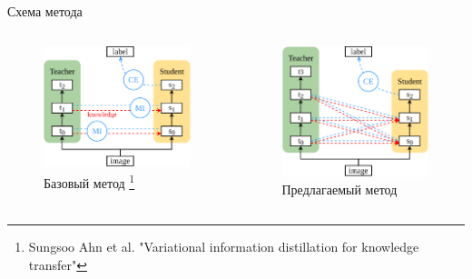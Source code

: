 \documentclass{beamer}
\begin{document}
\begin{frame}{Схема метода}

    \begin{columns}[c]
        \begin{figure}
            \includegraphics[width=1.0\textwidth]{ahn_diagram.pdf}
            \caption{Базовый метод \footnote{Sungsoo Ahn et al. "Variational information distillation for knowledge transfer"}}
        \end{figure}

        \begin{figure}
            \includegraphics[width=1.0\textwidth]{our_diagram.pdf}
            \caption{Предлагаемый метод}
        \end{figure}
    \end{columns}


\end{frame}
\end{document}
